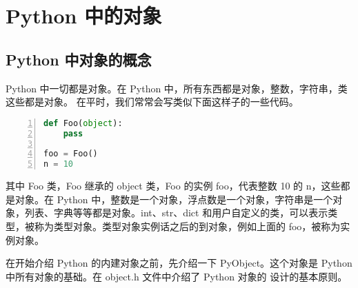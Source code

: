 \chapter{Python 中的对象}



\section{Python 中对象的概念}
Python 中一切都是对象。在 Python 中，所有东西都是对象，整数，字符串，类这些都是对象。 在平时，我们常常会写类似下面这样子的一些代码。

\begin{lstlisting}[language=Python, numbers=left, numbersep=1em, numberstyle=\footnotesize , breaklines=true]
def Foo(object):
	pass
	
foo = Foo()
n = 10
\end{lstlisting}

其中 Foo 类，Foo 继承的 object 类，Foo 的实例 foo，代表整数 10 的 n，这些都是对象。在 Python 中，整数是一个对象，浮点数是一个对象，字符串是一个对象，列表、字典等等都是对象。int、str、dict 和用户自定义的类，可以表示类型，被称为类型对象。类型对象实例话之后的到对象，例如上面的 foo，被称为实例对象。

在开始介绍 Python 的内建对象之前，先介绍一下 PyObject。这个对象是 Python 中所有对象的基础。在 object.h 文件中介绍了 Python 对象的
设计的基本原则。

